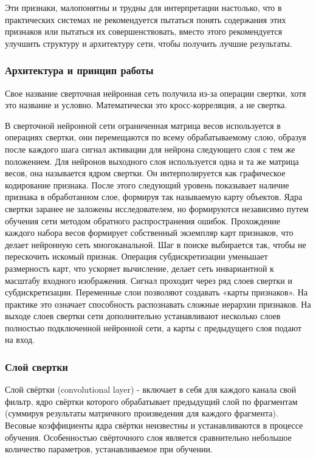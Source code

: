 Эти признаки, малопонятны и трудны для интерпретации настолько, что в практических системах не рекомендуется пытаться понять содержания этих признаков или пытаться их совершенствовать, вместо этого рекомендуется улучшить структуру и архитектуру сети, чтобы получить лучшие результаты.

\subsubsection{Архитектура и принцип работы}

Свое название сверточная нейронная сеть получила из-за операции свертки, хотя это название и условно. Математически это кросс-корреляция, а не свертка.

В сверточной нейронной сети ограниченная матрица весов используется в операциях свертки, они перемещаются по всему обрабатываемому слою, образуя после каждого шага сигнал активации для нейрона следующего слоя с тем же положением. Для нейронов выходного слоя используется одна и та же матрица весов, она называется ядром свертки. Он интерполируется как графическое кодирование признака. После этого следующий уровень показывает наличие признака в обработанном слое, формируя так называемую карту объектов. Ядра свертки заранее не заложены исследователем, но формируются независимо путем обучения сети методом обратного распространения ошибок. Прохождение каждого набора весов формирует собственный экземпляр карт признаков, что делает нейронную сеть многоканальной. Шаг в поиске выбирается так, чтобы не перескочить искомый признак. Операция субдискретизации уменьшает размерность карт, что ускоряет вычисление, делает сеть инвариантной к масштабу входного изображения. Сигнал проходит через ряд слоев свертки и субдискретизации. Переменные слои позволяют создавать «карты признаков». На практике это означает способность распознавать сложные иерархии признаков. На выходе слоев свертки сети дополнительно устанавливают несколько слоев полностью подключенной нейронной сети, а карты с предыдущего слоя подают на вход.

\subsubsection{Слой свертки}
Слой свёртки (convolutional layer) - включает в себя для каждого канала свой фильтр, ядро свёртки которого обрабатывает предыдущий слой по фрагментам (суммируя результаты матричного произведения для каждого фрагмента). Весовые коэффициенты ядра свёртки неизвестны и устанавливаются в процессе обучения. Особенностью свёрточного слоя является сравнительно неболь­шое количество параметров, устанавливаемое при обучении. 


